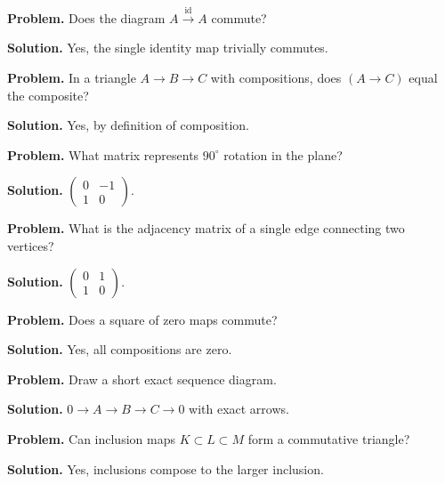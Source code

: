 \begin{example}\label{ex:sec14-1}
\textbf{Problem.} Does the diagram $A\xrightarrow{\mathrm{id}}A$ commute?

\textbf{Solution.} Yes, the single identity map trivially commutes.
\end{example}

\begin{example}\label{ex:sec14-2}
\textbf{Problem.} In a triangle $A\to B\to C$ with compositions, does $(A\to C)$ equal the composite?

\textbf{Solution.} Yes, by definition of composition.
\end{example}

\begin{example}\label{ex:sec14-3}
\textbf{Problem.} What matrix represents $90^\circ$ rotation in the plane?

\textbf{Solution.} $\begin{pmatrix}0&-1\\1&0\end{pmatrix}$.
\end{example}

\begin{example}\label{ex:sec14-4}
\textbf{Problem.} What is the adjacency matrix of a single edge connecting two vertices?

\textbf{Solution.} $\begin{pmatrix}0&1\\1&0\end{pmatrix}$.
\end{example}

\begin{example}\label{ex:sec14-5}
\textbf{Problem.} Does a square of zero maps commute?

\textbf{Solution.} Yes, all compositions are zero.
\end{example}

\begin{example}\label{ex:sec14-6}
\textbf{Problem.} Draw a short exact sequence diagram.

\textbf{Solution.} $0\to A\to B\to C\to0$ with exact arrows.
\end{example}

\begin{example}\label{ex:sec14-7}
\textbf{Problem.} Can inclusion maps $K\subset L\subset M$ form a commutative triangle?

\textbf{Solution.} Yes, inclusions compose to the larger inclusion.
\end{example}

